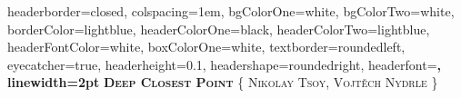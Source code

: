 \documentclass[landscape,a3paper,fontscale=0.78]{baposter} %
\begin{document}
\begin{poster}
{
headerborder=closed, %
colspacing=1em, %
bgColorOne=white, %
bgColorTwo=white, %
borderColor=lightblue, %
headerColorOne=black, %
headerColorTwo=lightblue, %
headerFontColor=white, %
boxColorOne=white, %
textborder=roundedleft, %
eyecatcher=true, %
headerheight=0.1\textheight, %
headershape=roundedright, %
headerfont=\Large\bf\textsc, %
linewidth=2pt %
}
%
{%
} %
{\bf\textsc{Deep Closest Point}\vspace{0.5em}} %
{\textsc{\{ Nikolay Tsoy, Vojtěch Nydrle \}}} %
{%
} %




\end{poster}
\end{document}
